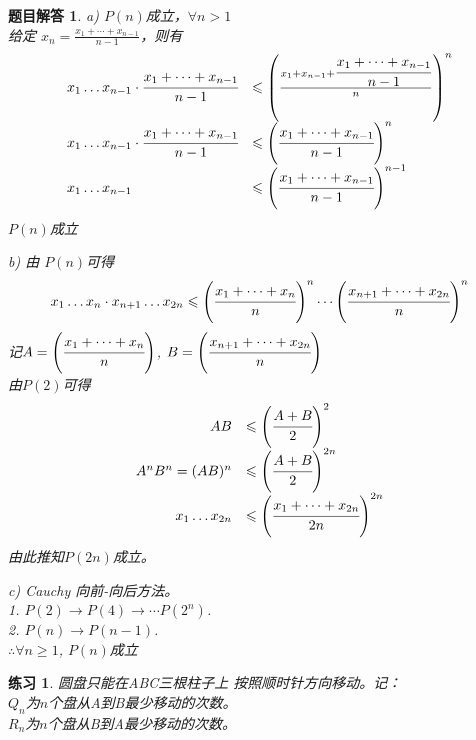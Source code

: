 \documentclass[mode=geye]{elegantnote}
\newtheorem{exercise}{练习}
\newtheorem{answer}{题目解答}
\begin{document}
\begin{answer}
	a) $ P(n) $成立，$ \forall n>1 $\\
	给定 $ x_n = \frac{x_{1}+\cdots+x_{n-1}}{n-1} $，则有
	\begin{equation*}
		\begin{array}{ll}
			x_1 \dots x_{n-1} \cdot \cfrac{x_{1}+\dots+x_{n-1}}{n-1} 
			&\leqslant \left( \frac{	x_1 + x_{n-1} + \cfrac{x_{1}+\dots+x_{n-1}}{n-1} }{n} \right) ^n \\
			x_1 \dots x_{n-1} \cdot \cfrac{x_{1}+\dots+x_{n-1}}{n-1}
			&\leqslant \left(  \cfrac{x_{1}+\dots+x_{n-1}}{n-1} \right) ^n \\
			x_1 \dots x_{n-1}
			&\leqslant \left(  \cfrac{x_{1}+\dots+x_{n-1}}{n-1} \right) ^{n-1}\\
		\end{array}
	\end{equation*}
	$ P(n) $成立
	
	b) 由 $ P(n) $可得
	\begin{equation*}
		x_{1} \dots x_{n} \cdot x_{n+1} \dots x_{2n} \leqslant \left(\cfrac{x_{1} + \dots + x_{n}}{n}\right)^n \cdots \left(\cfrac{x_{n+1} + \dots + x_{2n}}{n}\right)^n
	\end{equation*}
	记$ A = \left(\cfrac{x_{1} + \dots + x_{n}}{n}\right) $,  $ B = \left(\cfrac{x_{n+1} + \dots + x_{2n}}{n}\right) $\\
	由$ P(2) $可得
	\begin{equation*}
		\begin{array}{rl}
			AB &\leqslant \left(\cfrac{A+B}{2}\right)^{2}  \\
			A^{n} B^{n} = (AB)^{n} &\leqslant \left(\cfrac{A+B}{2}\right)^{2n} \\
			x_{1}\dots x_{2n} &\leqslant \left(\cfrac{x_{1}+\dots +x_{2n}}{2n}\right)^{2n} \\
		\end{array}
	\end{equation*}
	由此推知$ P(2n) $成立。
	
	c) Cauchy 向前-向后方法。\\
	1. $ P(2)\rightarrow P(4)\rightarrow\cdots P(2^n) $. \\
	2. $ P(n)\rightarrow P(n-1) $.\\
	$ \therefore \forall n\geqslant 1 $, $ P(n) $成立
\end{answer}

\begin{exercise}
	圆盘只能在ABC三根柱子上 按照顺时针方向移动。记：\\
	$ Q_{n} $为$ n $个盘从A到B最少移动的次数。\\
	$ R_{n} $为$ n $个盘从B到A最少移动的次数。	
\end{exercise}
\end{document}

